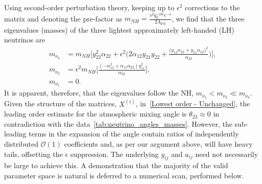 \documentclass[11pt,letterpaper]{article}
\begin{document}
Using second-order perturbation theory, keeping up to $\epsilon^2$ corrections to the matrix and denoting the pre-factor as $m_{NH}=\frac{v^2q_Y^{-2K}\epsilon^{-4}}{2\Lambda_{\text{FN}}}$, we find that the three eigenvalues (masses) of the three lightest approximately left-handed (LH) neutrinos are 
\begin{equation} 
\begin{aligned}
    m_{\nu_3} &= m_{NH}\Bigg[
    y_{22}^2 \alpha_{22}
    + \epsilon^2 \Bigg(2\alpha_{12}y_{21}y_{22}+ \frac{(y_{12}\alpha_{22} + y_{11}\alpha_{12}\big)^2}{\alpha_{22}}
    \Bigg)
    \Bigg],\\[6pt]
    m_{\nu_2} &= \epsilon^2 m_{NH} \Bigg[
    \frac{(-\alpha_{12}^2 + \alpha_{11}\alpha_{22})y_{11}^2}{\alpha_{22}}
    \Bigg],\\[4pt]
    m_{\nu_1} &= 0. \label{NormalHierarchy}
\end{aligned}
\end{equation}
%
It is apparent, therefore, that the eigenvalues follow the NH,
$m_{\nu_1} < m_{\nu_2} \ll m_{\nu_3}$. Given the structure of the matrices,
$X^{(i)}$, in~\cref{Lowest order - Unchanged}, the leading order estimate for
the atmospheric mixing angle is $\theta_{23} \approx 0$ in contradiction with
the data~\cref{tab:neutrino_angles_masses}. However, the sub-leading terms in
the expansion of the angle contain ratios of independently distributed
$\mathcal{O}(1)$ coefficients and, as per our argument above, will have heavy
tails, offsetting the $\epsilon$ suppression. The underlying $y_{ij}$ and
$a_{ij}$ need not necessarily be large to achieve this. A demonstration that the
majority of the valid parameter space is natural is deferred to a numerical
scan, performed below.
\end{document}
